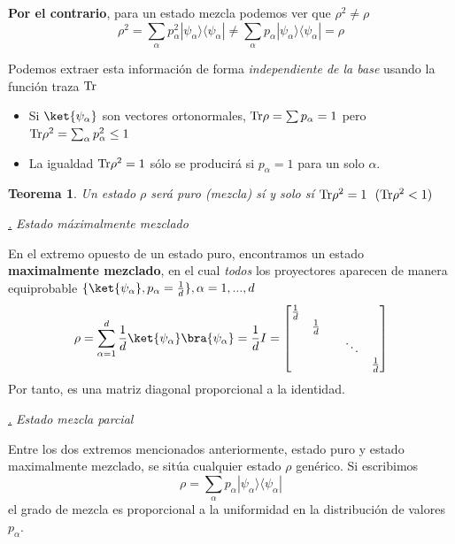 \documentclass[a4paper,11pt]{book} %
\newtheorem{teorema_contador}{Teorema}
\newcommand{\Teorema}[1]{
		\begin{mybox_gray2}{}
			\begin{teorema_contador}
				 #1 
			\end{teorema_contador} 
		\end{mybox_gray2}
	}
\numberwithin{equation}{chapter}
\newcommand{\ketbra}[2]{| #1\rangle \! \langle #2|}
\def\subsubiContadorIt{\par\addtocounter{subsubsection}{1}\underline{\it\thesubsubsection.}\hskip0.5cm \setcounter{subsubsubsectionIt}{0}}
\newcommand{\SubsubiIt}[1]{
		\subsubiContadorIt \textit{#1}
	}
\newcounter{subsubsubsectionIt}[subsubsection]
\begin{document}
\textbf{Por el contrario}, para un estado mezcla podemos ver que $\rho^2 \neq \rho$
	\begin{equation}
	\rho^2  = \sum_\alpha p_\alpha^2 \ketbra{\psi_\alpha}{\psi_\alpha} \neq  \sum_\alpha p_\alpha \ketbra{\psi_\alpha}{\psi_\alpha} = \rho
	\end{equation}

Podemos extraer esta información de forma \textit{independiente de la base} usando la función traza  ${\rm Tr}$
\begin{itemize}
	\item Si $\ket{\psi_\alpha}$ son vectores ortonormales,  ${\rm Tr } \rho = \sum p_\alpha = 1$ pero  ${\rm Tr }\rho^2 = \sum_\alpha p_\alpha^2\leq 1$
	
	\item La igualdad ${\rm Tr} \rho^2=1$ sólo se producirá si  $p_\alpha = 1$ para un solo $\alpha$. 
\end{itemize}

	\Teorema{
	Un estado  $\rho$ será \textit{puro} (\textit{mezcla}) sí y solo sí ${\rm Tr } \rho^2 = 1~~ ({\rm Tr } \rho^2 <1)$  
	}


			\SubsubiIt{Estado máximalmente mezclado}

En el extremo opuesto de un estado puro, encontramos un estado \textbf{maximalmente mezclado}, en el cual \textit{todos} los proyectores aparecen de manera equiprobable $\{\ket{\psi_\alpha},p_\alpha = \frac{1}{d}\}, \alpha = 1,...,d$
	\begin{equation}
	\rho = \sum_{\alpha=1}^d \frac{1}{d} \ket{\psi_\alpha}\bra{\psi_\alpha} = \frac{1}{d} I = \begin{bmatrix}\frac{1}{d} &  & & \\ & \frac{1}{d} &  &\\ & & &\ddots & \\ & & & & \frac{1}{d} \end{bmatrix}
	\end{equation}
Por tanto, es una matriz diagonal proporcional a la identidad.


			\SubsubiIt{Estado mezcla parcial}

Entre los dos extremos mencionados anteriormente, estado puro y estado maximalmente mezclado, se sitúa cualquier estado $\rho$ genérico. Si escribimos
	\begin{equation}
	\rho = \sum_{\alpha} p_\alpha \ketbra{\psi_\alpha}{\psi_\alpha}
	\end{equation}
el grado de mezcla es proporcional a la uniformidad en la distribución de valores $p_\alpha$. 
\end{document}
